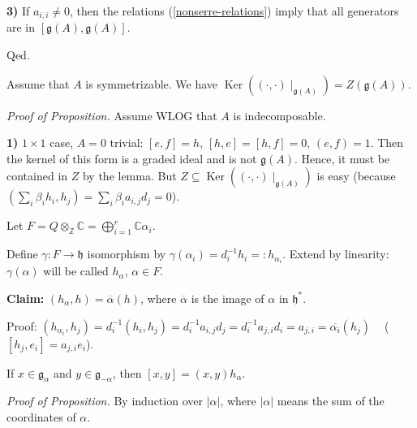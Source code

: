\documentclass[etingof-lie.tex]{subfiles}
\begin{document}
\textbf{3)} If $a_{i,i}\neq0$, then the relations (\ref{nonserre-relations})
imply that all generators are in $\left[  \mathfrak{g}\left(  A\right)
,\mathfrak{g}\left(  A\right)  \right]  $.

Qed.

\begin{proposition}
Assume that $A$ is symmetrizable. We have $\operatorname*{Ker}\left(  \left(
\cdot,\cdot\right)  \mid_{\mathfrak{g}\left(  A\right)  }\right)  =Z\left(
\mathfrak{g}\left(  A\right)  \right)  $.
\end{proposition}

\textit{Proof of Proposition.} Assume WLOG that $A$ is indecomposable.

\textbf{1)} $1\times1$ case, $A=0$ trivial: $\left[  e,f\right]  =h$, $\left[
h,e\right]  =\left[  h,f\right]  =0$, $\left(  e,f\right)  =1$. Then the
kernel of this form is a graded ideal and is not $\mathfrak{g}\left(
A\right)  $. Hence, it must be contained in $Z$ by the lemma. But
$Z\subseteq\operatorname*{Ker}\left(  \left(  \cdot,\cdot\right)
\mid_{\mathfrak{g}\left(  A\right)  }\right)  $ is easy (because $\left(
\sum\limits_{i}\beta_{i}h_{i},h_{j}\right)  =\sum\limits_{i}\beta_{i}%
a_{i,j}d_{j}=0$).

Let $F=Q\otimes_{\mathbb{Z}}\mathbb{C}=\bigoplus_{i=1}^{r}\mathbb{C}\alpha
_{i}$.

Define $\gamma:F\rightarrow\mathfrak{h}$ isomorphism by $\gamma\left(
\alpha_{i}\right)  =d_{i}^{-1}h_{i}=:h_{\alpha_{i}}$. Extend by linearity:
$\gamma\left(  \alpha\right)  $ will be called $h_{\alpha}$, $\alpha\in F$.

\textbf{Claim:} $\left(  h_{\alpha},h\right)  =\overline{\alpha}\left(
h\right)  $, where $\overline{\alpha}$ is the image of $\alpha$ in
$\mathfrak{h}^{\ast}$.

Proof: $\left(  h_{\alpha_{i}},h_{j}\right)  =d_{i}^{-1}\left(  h_{i}%
,h_{j}\right)  =d_{i}^{-1}a_{i,j}d_{j}=d_{i}^{-1}a_{j,i}d_{i}=a_{j,i}%
=\overline{\alpha_{i}}\left(  h_{j}\right)  \ \ \ \ $ ($\left[  h_{j}%
,e_{i}\right]  =a_{j,i}e_{i}$).

\begin{proposition}
If $x\in\mathfrak{g}_{\alpha}$ and $y\in\mathfrak{g}_{-\alpha}$, then $\left[
x,y\right]  =\left(  x,y\right)  h_{\alpha}$.
\end{proposition}

\textit{Proof of Proposition.} By induction over $\left\vert \alpha\right\vert
$, where $\left\vert \alpha\right\vert $ means the sum of the coordinates of
$\alpha$.
\end{document}
